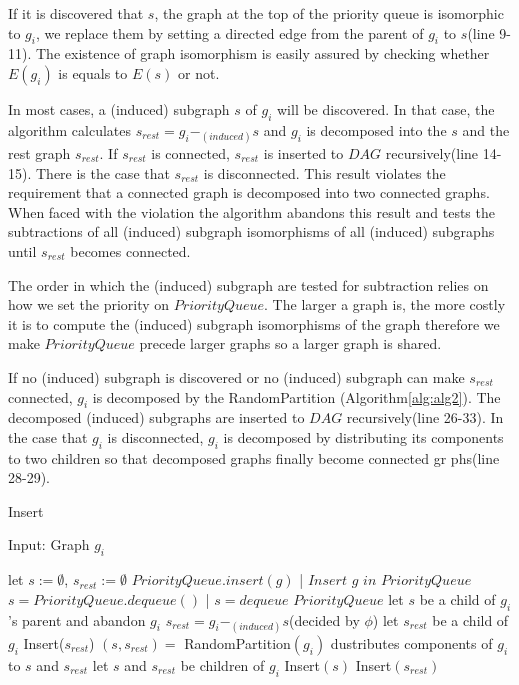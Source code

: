 If it is discovered that  $s$, the graph at the top of the priority queue is isomorphic to $g_i$,
we replace them by setting a directed edge from the parent of $g_i$ to $s$(line 9-11).
The existence of graph isomorphism is easily assured by checking whether $E(g_i)$ is equals to $E(s)$ or not.

In most cases, a (induced) subgraph $s$ of $g_i$ will be discovered. In that case, the algorithm calculates $s_{rest} = g_i -_{(induced)} s$ and $g_i$ is decomposed into the $s$ and the rest graph $s_{rest}$.
If $s_{rest}$ is connected, $s_{rest}$ is inserted to $DAG$ recursively(line 14-15).
There is the case that $s_{rest}$ is disconnected.
This result violates the requirement that a connected graph is decomposed into two connected graphs.
When faced with the violation the algorithm abandons this result and tests the subtractions of all (induced) subgraph isomorphisms of all (induced) subgraphs until $s_{rest}$ becomes connected.

The order in which the  (induced) subgraph are tested for subtraction relies on how we set the priority on $PriorityQueue$.
The larger a graph is, the more costly it is to compute the (induced) subgraph isomorphisms of the graph therefore we make $PriorityQueue$ precede larger graphs
so a larger graph is shared.

If no (induced) subgraph is discovered or no (induced) subgraph can make $s_{rest}$ connected, $g_i$ is decomposed by the RandomPartition (Algorithm\ref{alg:alg2}).
The decomposed (induced) subgraphs are inserted to $DAG$ recursively(line 26-33).
In the case that $g_i$ is disconnected, $g_i$ is decomposed by distributing its components to two children so that decomposed graphs finally become connected gr
phs(line 28-29).

\begin{algorithm}[t]
\caption{Insert}
\label{alg:alg1}
\begin{algorithmic}
\STATE Input: Graph $g_i$
\end{algorithmic}
\begin{algorithmic}[1]
\STATE let $s := \emptyset$, $s_{rest} := \emptyset$
			\STATE $PriorityQueue.insert(g)$ | $Insert$  $g$ $in$ $PriorityQueue$ 
		\ENDIF
	\ENDFOR
\ENDIF
{}
	\STATE $s = PriorityQueue.dequeue()$ | $s=dequeue$ $PriorityQueue$ 
		\STATE let $s$ be a child of $g_i$'s parent and abandon $g_i$
		\RETURN
	\ELSE
			\STATE $s_{rest} = g_i -_{(induced)} s$(decided by $\phi$)
				\STATE let $s_{rest}$ be a child of $g_i$
				\STATE Insert($s_{rest}$)
				\RETURN
			\ENDIF
		\ENDFOR
	\ENDIF
\ENDWHILE
{}
		\STATE $( s, s_{rest} ) =$ RandomPartition$(g_i)$
	\ELSE
		\STATE dustributes components of $g_i$ to $s$ and $s_{rest}$
	\ENDIF
	\STATE let $s$ and $s_{rest}$ be children of $g_i$
	\STATE Insert$(s)$	
	\STATE Insert$(s_{rest})$
\ENDIF
\end{algorithmic}
\end{algorithm}

